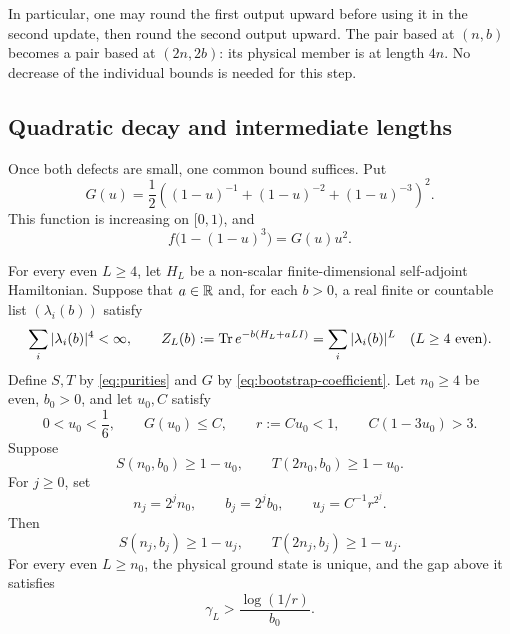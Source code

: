 In particular, one may round the first output upward before using it
in the second update, then round the second output upward.  The pair
based at $(n,b)$ becomes a pair based at $(2n,2b)$: its physical member
is at length $4n$.  No decrease of the individual bounds is needed for
this step.

\subsection{Quadratic decay and intermediate lengths}

Once both defects are small, one common bound suffices.  Put
\begin{equation}\label{eq:bootstrap-coefficient}
 G(u)=\frac12\left((1-u)^{-1}+(1-u)^{-2}+(1-u)^{-3}\right)^2.
\end{equation}
This function is increasing on $[0,1)$, and
\begin{equation}\label{eq:bootstrap-factorization}
 f\bigl(1-(1-u)^3\bigr)=G(u)u^2.
\end{equation}

\begin{proposition}
\label{prop:bootstrap}
For every even $L\ge4$, let $H_L$ be a non-scalar finite-dimensional
self-adjoint Hamiltonian. Suppose that $a\in\mathbb R$ and, for each $b>0$,
a real finite or countable list $(\lambda_i(b))$ satisfy
\[
 \sum_i|\lambda_i(b)|^4<\infty,\qquad
 Z_L(b):=\operatorname{Tr} e^{-b(H_L+aLI)}=\sum_i|\lambda_i(b)|^L
 \quad(L\ge4\text{ even}).
\]
Define $S,T$ by \eqref{eq:purities} and $G$ by
\eqref{eq:bootstrap-coefficient}. Let $n_0\ge4$ be even,
$b_0>0$, and let $u_0,C$ satisfy
\begin{equation}\label{eq:bootstrap-hypotheses}
 0<u_0<\frac16,\qquad G(u_0)\le C,\qquad
 r:=Cu_0<1,\qquad C(1-3u_0)>3.
\end{equation}
Suppose
\begin{equation}\label{eq:bootstrap-seeds}
 S(n_0,b_0)\ge1-u_0,\qquad T(2n_0,b_0)\ge1-u_0.
\end{equation}
For $j\ge0$, set
\begin{equation}\label{eq:dyadic-parameters}
 n_j=2^j n_0,\qquad b_j=2^j b_0,\qquad
 u_j=C^{-1}r^{2^j}.
\end{equation}
Then
\begin{equation}\label{eq:dyadic-purities}
 S(n_j,b_j)\ge1-u_j,\qquad T(2n_j,b_j)\ge1-u_j.
\end{equation}
For every even $L\ge n_0$, the physical ground state is unique, and
the gap above it satisfies
\begin{equation}\label{eq:bootstrap-gap}
 \gamma_L>\frac{\log(1/r)}{b_0}.
\end{equation}
\end{proposition}

